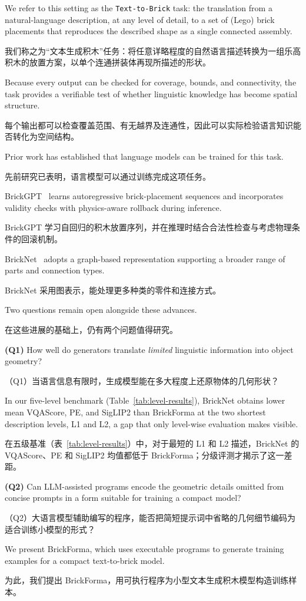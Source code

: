 \documentclass[11pt,letterpaper]{article}
\let\cite\citep
\newcommand{\pair}[2]{\par\addvspace{4pt}\noindent
  \begin{minipage}{\linewidth}\raggedright
  #1\par\nobreak\vspace{1pt}
  {\color{translation}\chinesefont\fontsize{10.5}{15.3}\selectfont #2\par}
  \end{minipage}\par}
\begin{document}
\pair{We refer to this setting as the \texttt{Text-to-Brick} task: the translation from a natural-language description, at any level of detail, to a set of (Lego) brick placements that reproduces the described shape as a single connected assembly.}{我们称之为“文本生成积木”任务：将任意详略程度的自然语言描述转换为一组乐高积木的放置方案，以单个连通拼装体再现所描述的形状。}

\pair{Because every output can be checked for coverage, bounds, and connectivity, the task provides a verifiable test of whether linguistic knowledge has become spatial structure.}{每个输出都可以检查覆盖范围、有无越界及连通性，因此可以实际检验语言知识能否转化为空间结构。}

\pair{Prior work has established that language models can be trained for this task.}{先前研究已表明，语言模型可以通过训练完成这项任务。}

\pair{BrickGPT~\cite{brickgpt} learns autoregressive brick-placement sequences and incorporates validity checks with physics-aware rollback during inference.}{BrickGPT 学习自回归的积木放置序列，并在推理时结合合法性检查与考虑物理条件的回滚机制。}

\pair{BrickNet~\cite{bricknet} adopts a graph-based representation supporting a broader range of parts and connection types.}{BrickNet 采用图表示，能处理更多种类的零件和连接方式。}

\pair{Two questions remain open alongside these advances.}{在这些进展的基础上，仍有两个问题值得研究。}

\pair{\textbf{(Q1)} How well do generators translate \emph{limited} linguistic information into object geometry?}{（Q1）当语言信息有限时，生成模型能在多大程度上还原物体的几何形状？}

\pair{In our five-level benchmark (Table~\ref{tab:level-results}), BrickNet obtains lower mean VQAScore, PE, and SigLIP2 than BrickForma at the two shortest description levels, L1 and L2, a gap that only level-wise evaluation makes visible.}{在五级基准（表~\ref{tab:level-results}）中，对于最短的 L1 和 L2 描述，BrickNet 的 VQAScore、PE 和 SigLIP2 均值都低于 BrickForma；分级评测才揭示了这一差距。}

\pair{\textbf{(Q2)} Can LLM-assisted programs encode the geometric details omitted from concise prompts in a form suitable for training a compact model?}{（Q2）大语言模型辅助编写的程序，能否把简短提示词中省略的几何细节编码为适合训练小模型的形式？}

\pair{We present BrickForma, which uses executable programs to generate training examples for a compact text-to-brick model.}{为此，我们提出 BrickForma，用可执行程序为小型文本生成积木模型构造训练样本。}
\end{document}

